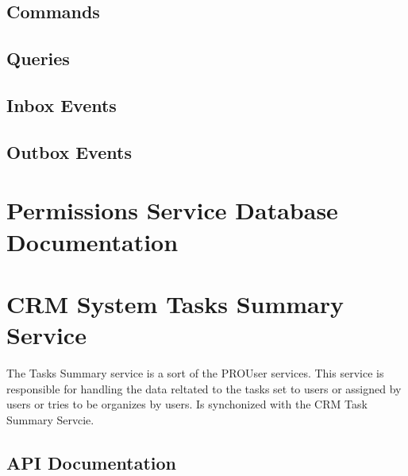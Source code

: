 \documentclass[letterpaper,10pt,english]{sphinxmanual}
\begin{document}
\subsection{Commands}
\label{\detokenize{crm_system/permissions_service:commands}}

\subsection{Queries}
\label{\detokenize{crm_system/permissions_service:queries}}

\subsection{Inbox Events}
\label{\detokenize{crm_system/permissions_service:inbox-events}}

\subsection{Outbox Events}
\label{\detokenize{crm_system/permissions_service:outbox-events}}

\section{Permissions Service Database Documentation}
\label{\detokenize{crm_system/permissions_service:permissions-service-database-documentation}}
\sphinxstepscope


\section{CRM System Tasks Summary Service}
\label{\detokenize{crm_system/tasks_summary_service:crm-system-tasks-summary-service}}\label{\detokenize{crm_system/tasks_summary_service::doc}}
\sphinxAtStartPar
The Tasks Summary service is a sort of the PRO\sphinxhyphen{}User services. This service is responsible for handling the data reltated to the tasks set to users or assigned by users or tries to be organizes by users. Is synchonized with the CRM Task Summary Servcie.



\subsection{API Documentation}
\label{\detokenize{crm_system/tasks_summary_service:api-documentation}}
\end{document}
